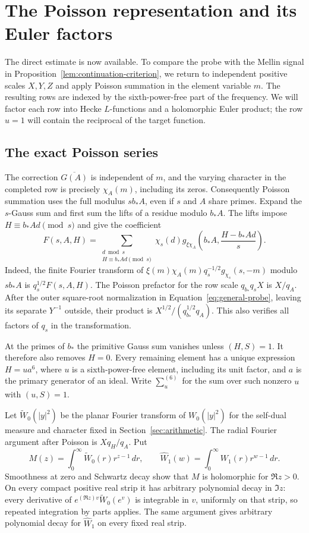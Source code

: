\documentclass[11pt,a4paper]{article}
\numberwithin{equation}{section}
\numberwithin{figure}{section}
\theoremstyle{definition}
\theoremstyle{remark}
\begin{document}
\section{The Poisson representation and its Euler factors}
\label{sec:poisson-representation}

The direct estimate is now available. To compare the probe with the
Mellin signal in Proposition~\ref{lem:continuation-criterion}, we return
to independent positive scales $X,Y,Z$ and apply Poisson summation in
the element variable $m$. The resulting rows are indexed by the
sixth-power-free part of the frequency. We will factor each row into
Hecke $L$-functions and a holomorphic Euler product; the row $u=1$
will contain the reciprocal of the target function.

\subsection{The exact Poisson series}

The correction $\overline{G(A)}$ is independent of $m$, and the
varying character in the completed row is precisely $\chi_A(m)$,
including its zeros.  Consequently Poisson summation uses the full
modulus $sb_*A$, even if $s$ and $A$ share primes.  Expand the
$s$-Gauss sum and first sum the lifts of a residue modulo $b_*A$.
The lifts impose $H\equiv b_*Ad\pmod s$ and give the coefficient
\begin{equation}\label{eq:local-F}
 F(s,A,H)=\sum_{\substack{d\bmod s\\H\equiv b_*Ad\pmod s}}
 \chi_s(d)g_{\xi\chi_A}\!\left(b_*A,\frac{H-b_*Ad}{s}\right).
\end{equation}
Indeed, the finite Fourier transform of
$\xi(m)\chi_A(m)q_s^{-1/2}g_{\chi_s}(s,-m)$ modulo $sb_*A$ is
$q_s^{1/2}F(s,A,H)$.  The Poisson prefactor for the row scale
$q_{b_*}q_sX$ is $X/q_A$.  After the outer square-root normalization in
Equation~\eqref{eq:general-probe}, leaving its separate $Y^{-1}$ outside,
their product is
$X^{1/2}/(q_{b_*}^{1/2}q_A)$.  This also verifies all factors of
$q_s$ in the transformation.

At the primes of $b_*$ the primitive Gauss sum vanishes unless
$(H,S)=1$.  It therefore also removes $H=0$.  Every remaining
element has a unique expression
$H=ua^6$, where $u$ is a sixth-power-free element, including its
unit factor, and $a$ is the primary generator of an ideal.  Write
$\sum_u^{(6)}$ for the sum over such nonzero $u$ with $(u,S)=1$.

Let $\widetilde W_0(|y|^2)$ be the planar Fourier transform of
$W_0(|y|^2)$ for the self-dual measure and character fixed in
Section~\ref{sec:arithmetic}.  The radial Fourier argument after
Poisson is $Xq_H/q_A$.  Put
\[
 M(z)=\int_0^\infty\widetilde W_0(r)r^{z-1}\,dr,
 \qquad
 \widehat W_1(w)=\int_0^\infty W_1(r)r^{w-1}\,dr.
\]
Smoothness at zero and Schwartz decay show that $M$ is holomorphic
for $\Re z>0$.  On every compact positive real strip it has
arbitrary polynomial decay in $\Im z$: every derivative of
$e^{(\Re z)v}\widetilde W_0(e^v)$ is integrable in $v$, uniformly
on that strip, so repeated integration by parts applies.  The same
argument gives arbitrary polynomial decay for $\widehat W_1$ on
every fixed real strip.
\end{document}
